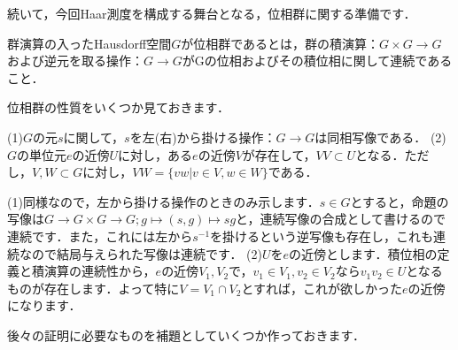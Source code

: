 
続いて，今回Haar測度を構成する舞台となる，位相群に関する準備です．

\begin{defi}[位相群]\label{12}
群演算の入ったHausdorff空間$G$が位相群であるとは，群の積演算：$G \times G \to G$および逆元を取る操作：$G \to G$がGの位相およびその積位相に関して連続であること．
\end{defi}
位相群の性質をいくつか見ておきます．
\begin{prop}[位相群の性質]\label{13}
(1)$G$の元$s$に関して，$s$を左(右)から掛ける操作：$G \to G$は同相写像である．
(2)$G$の単位元$e$の近傍$U$に対し，ある$e$の近傍$V$が存在して，$VV \subset U$となる．ただし，$V,W \subset G$に対し，$VW= \{ vw | v \in V, w \in W \}$である．
\end{prop}
\begin{Proof}
(1)同様なので，左から掛ける操作のときのみ示します．$s \in G$とすると，命題の写像は$G \to G \times G \to G ; g \mapsto (s,g) \mapsto sg$と，連続写像の合成として書けるので連続です．また，これには左から$s^{-1}$を掛けるという逆写像も存在し，これも連続なので結局与えられた写像は連続です．
(2)$U$を$e$の近傍とします．積位相の定義と積演算の連続性から，$e$の近傍$V_1, V_2$で，$v_{1} \in V_1, v_{2} \in V_2$なら$v_{1}v_{2} \in U$となるものが存在します．よって特に$V=V_1 \cap V_2$とすれば，これが欲しかった$e$の近傍になります．
\end{Proof}
後々の証明に必要なものを補題としていくつか作っておきます．

